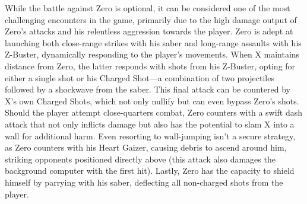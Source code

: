 While the battle against Zero is optional, it can be considered one of the most challenging encounters in the game, primarily due to the high damage output of Zero's attacks and his relentless aggression towards the player. Zero is adept at launching both close-range strikes with his saber and long-range assaults with his Z-Buster, dynamically responding to the player's movements. When X maintains distance from Zero, the latter responds with shots from his Z-Buster, opting for either a single shot or his Charged Shot—a combination of two projectiles followed by a shockwave from the saber. This final attack can be countered by X's own Charged Shots, which not only nullify but can even bypass Zero's shots. Should the player attempt close-quarters combat, Zero counters with a swift dash attack that not only inflicts damage but also has the potential to slam X into a wall for additional harm. Even resorting to wall-jumping isn't a secure strategy, as Zero counters with his Heart Gaizer, causing debris to ascend around him, striking opponents positioned directly above (this attack also damages the background computer with the first hit). Lastly, Zero has the capacity to shield himself by parrying with his saber, deflecting all non-charged shots from the player.
